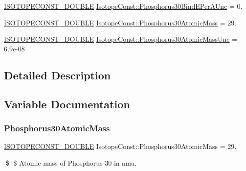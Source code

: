 \begin{DoxyCompactItemize}
\mbox{\hyperlink{group___isotope_const-_macros_ga8f45a7272ce02c0b4c65c44636ed719a}{I\+S\+O\+T\+O\+P\+E\+C\+O\+N\+S\+T\+\_\+\+D\+O\+U\+B\+LE}} \mbox{\hyperlink{group___isotope_const-_phosphorus-_p30_ga98fb2770cad1befc0528bb90c8cc9e34}{Isotope\+Const\+::\+Phosphorus30\+Bind\+E\+Per\+A\+Unc}} = 0.
\item 
\mbox{\hyperlink{group___isotope_const-_macros_ga8f45a7272ce02c0b4c65c44636ed719a}{I\+S\+O\+T\+O\+P\+E\+C\+O\+N\+S\+T\+\_\+\+D\+O\+U\+B\+LE}} \mbox{\hyperlink{group___isotope_const-_phosphorus-_p30_ga8aadf63f31f291a22bc55ed5f5d6bff0}{Isotope\+Const\+::\+Phosphorus30\+Atomic\+Mass}} = 29.
\item 
\mbox{\hyperlink{group___isotope_const-_macros_ga8f45a7272ce02c0b4c65c44636ed719a}{I\+S\+O\+T\+O\+P\+E\+C\+O\+N\+S\+T\+\_\+\+D\+O\+U\+B\+LE}} \mbox{\hyperlink{group___isotope_const-_phosphorus-_p30_ga8ec707f92b69bc8b4077a6ea8de317ca}{Isotope\+Const\+::\+Phosphorus30\+Atomic\+Mass\+Unc}} = 6.\+9e-\/08
\end{DoxyCompactItemize}


\subsection{Detailed Description}


\subsection{Variable Documentation}
\mbox{\label{group___isotope_const-_phosphorus-_p30_ga8aadf63f31f291a22bc55ed5f5d6bff0}} 
\subsubsection{\texorpdfstring{Phosphorus30\+Atomic\+Mass}{Phosphorus30AtomicMass}}
{\footnotesize\ttfamily \mbox{\hyperlink{group___isotope_const-_macros_ga8f45a7272ce02c0b4c65c44636ed719a}{I\+S\+O\+T\+O\+P\+E\+C\+O\+N\+S\+T\+\_\+\+D\+O\+U\+B\+LE}} Isotope\+Const\+::\+Phosphorus30\+Atomic\+Mass = 29.}

\$ \$ Atomic mass of Phosphorus-\/30 in amu. \mbox{\label{group___isotope_const-_phosphorus-_p30_ga8ec707f92b69bc8b4077a6ea8de317ca}} 

